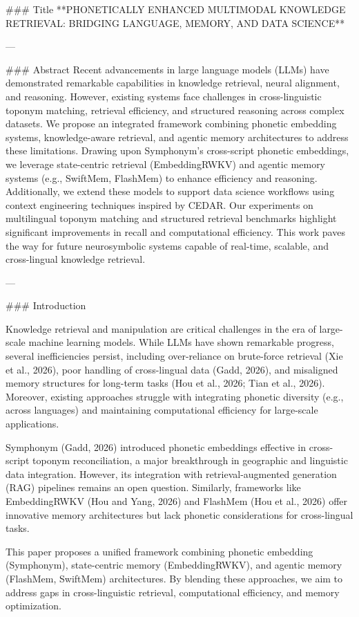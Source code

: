 ### Title  
**PHONETICALLY ENHANCED MULTIMODAL KNOWLEDGE RETRIEVAL: BRIDGING LANGUAGE, MEMORY, AND DATA SCIENCE**

---

### Abstract  
Recent advancements in large language models (LLMs) have demonstrated remarkable capabilities in knowledge retrieval, neural alignment, and reasoning. However, existing systems face challenges in cross-linguistic toponym matching, retrieval efficiency, and structured reasoning across complex datasets. We propose an integrated framework combining phonetic embedding systems, knowledge-aware retrieval, and agentic memory architectures to address these limitations. Drawing upon Symphonym's cross-script phonetic embeddings, we leverage state-centric retrieval (EmbeddingRWKV) and agentic memory systems (e.g., SwiftMem, FlashMem) to enhance efficiency and reasoning. Additionally, we extend these models to support data science workflows using context engineering techniques inspired by CEDAR. Our experiments on multilingual toponym matching and structured retrieval benchmarks highlight significant improvements in recall and computational efficiency. This work paves the way for future neurosymbolic systems capable of real-time, scalable, and cross-lingual knowledge retrieval.

---

### Introduction  

Knowledge retrieval and manipulation are critical challenges in the era of large-scale machine learning models. While LLMs have shown remarkable progress, several inefficiencies persist, including over-reliance on brute-force retrieval (Xie et al., 2026), poor handling of cross-lingual data (Gadd, 2026), and misaligned memory structures for long-term tasks (Hou et al., 2026; Tian et al., 2026). Moreover, existing approaches struggle with integrating phonetic diversity (e.g., across languages) and maintaining computational efficiency for large-scale applications.

Symphonym (Gadd, 2026) introduced phonetic embeddings effective in cross-script toponym reconciliation, a major breakthrough in geographic and linguistic data integration. However, its integration with retrieval-augmented generation (RAG) pipelines remains an open question. Similarly, frameworks like EmbeddingRWKV (Hou and Yang, 2026) and FlashMem (Hou et al., 2026) offer innovative memory architectures but lack phonetic considerations for cross-lingual tasks.

This paper proposes a unified framework combining phonetic embedding (Symphonym), state-centric memory (EmbeddingRWKV), and agentic memory (FlashMem, SwiftMem) architectures. By blending these approaches, we aim to address gaps in cross-linguistic retrieval, computational efficiency, and memory optimization.

